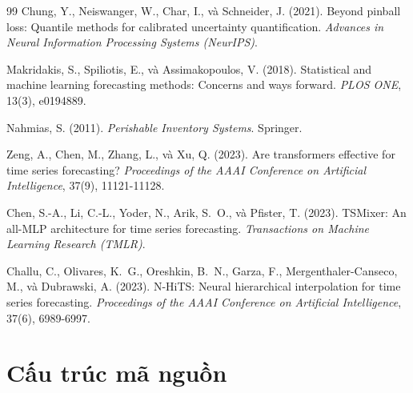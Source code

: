 \documentclass[12pt, a4paper]{report}
\begin{document}
\begin{thebibliography}{99}
Chung, Y., Neiswanger, W., Char, I., và Schneider, J. (2021).
\newblock Beyond pinball loss: Quantile methods for calibrated uncertainty quantification.
\newblock \textit{Advances in Neural Information Processing Systems (NeurIPS)}.

Makridakis, S., Spiliotis, E., và Assimakopoulos, V. (2018).
\newblock Statistical and machine learning forecasting methods: Concerns and ways forward.
\newblock \textit{PLOS ONE}, 13(3), e0194889.

Nahmias, S. (2011).
\newblock \textit{Perishable Inventory Systems}.
\newblock Springer.

Zeng, A., Chen, M., Zhang, L., và Xu, Q. (2023).
\newblock Are transformers effective for time series forecasting?
\newblock \textit{Proceedings of the AAAI Conference on Artificial Intelligence}, 37(9), 11121-11128.

Chen, S.-A., Li, C.-L., Yoder, N., Arik, S.~O., và Pfister, T. (2023).
\newblock TSMixer: An all-MLP architecture for time series forecasting.
\newblock \textit{Transactions on Machine Learning Research (TMLR)}.

Challu, C., Olivares, K.~G., Oreshkin, B.~N., Garza, F., Mergenthaler-Canseco, M., và Dubrawski, A. (2023).
\newblock N-HiTS: Neural hierarchical interpolation for time series forecasting.
\newblock \textit{Proceedings of the AAAI Conference on Artificial Intelligence}, 37(6), 6989-6997.

\end{thebibliography}

\appendix

\chapter{Cấu trúc mã nguồn}
\end{document}
